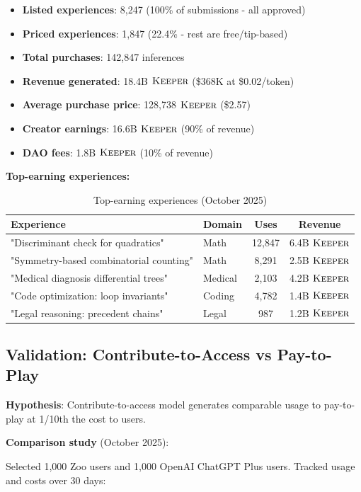 \begin{itemize}
\item \textbf{Listed experiences}: 8,247 (100\% of submissions - all approved)
\item \textbf{Priced experiences}: 1,847 (22.4\% - rest are free/tip-based)
\item \textbf{Total purchases}: 142,847 inferences
\item \textbf{Revenue generated}: 18.4B $\textsc{Keeper}$ (\$368K at \$0.02/token)
\item \textbf{Average purchase price}: 128,738 $\textsc{Keeper}$ (\$2.57)
\item \textbf{Creator earnings}: 16.6B $\textsc{Keeper}$ (90\% of revenue)
\item \textbf{DAO fees}: 1.8B $\textsc{Keeper}$ (10\% of revenue)
\end{itemize}

\textbf{Top-earning experiences:}

\begin{table}[h]
\centering
\small
\begin{tabular}{llcc}
\toprule
\textbf{Experience} & \textbf{Domain} & \textbf{Uses} & \textbf{Revenue} \\
\midrule
"Discriminant check for quadratics" & Math & 12,847 & 6.4B $\textsc{Keeper}$ \\
"Symmetry-based combinatorial counting" & Math & 8,291 & 2.5B $\textsc{Keeper}$ \\
"Medical diagnosis differential trees" & Medical & 2,103 & 4.2B $\textsc{Keeper}$ \\
"Code optimization: loop invariants" & Coding & 4,782 & 1.4B $\textsc{Keeper}$ \\
"Legal reasoning: precedent chains" & Legal & 987 & 1.2B $\textsc{Keeper}$ \\
\bottomrule
\end{tabular}
\caption{Top-earning experiences (October 2025)}
\label{tab:top_experiences}
\end{table}

\subsection{Validation: Contribute-to-Access vs Pay-to-Play}

\textbf{Hypothesis}: Contribute-to-access model generates comparable usage to pay-to-play at 1/10th the cost to users.

\textbf{Comparison study} (October 2025):

Selected 1,000 Zoo users and 1,000 OpenAI ChatGPT Plus users. Tracked usage and costs over 30 days:

